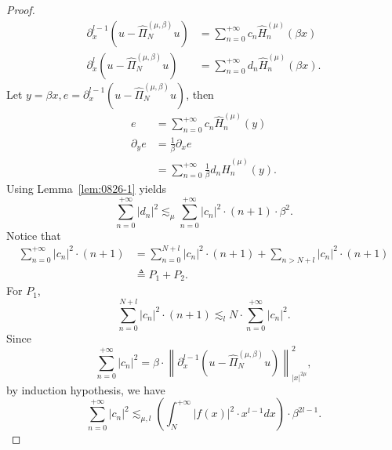 \documentclass[pdflatex,sn-aps]{sn-jnl}%
\theoremstyle{thmstyleone}%
\theoremstyle{thmstyletwo}%
\theoremstyle{thmstylethree}%
\begin{document}
\begin{appendices}
\begin{proof}
\begin{equation}
    \begin{aligned}
    \partial_x^{l-1}\left(u-\widehat{\Pi}_N^{(\mu, \beta)} u\right) & =\sum_{n=0}^{+\infty} c_n \widehat{H}_n^{(\mu)}(\beta x) \\
    \partial_x^l\left(u-\widehat{\Pi}_N^{(\mu, \beta)} u\right) & =\sum_{n=0}^{+\infty} d_n \widehat{H}_n^{(\mu)}(\beta x).
    \end{aligned}
  \end{equation}
  Let $y=\beta x, e=\partial_x^{l-1}\left(u-\widehat{\Pi}_N^{(\mu, \beta)} u\right)$, then
  \begin{equation}\label{eq:0826-21}
    \begin{aligned}
    e & =\sum_{n=0}^{+\infty} c_n \widehat{H}_n^{(\mu)}(y) \\
    \partial_y e & =\frac{1}{\beta} \partial_x e \\
    & =\sum_{n=0}^{+\infty} \frac{1}{\beta} d_n \widehat{H}_n^{(\mu)}(y).
    \end{aligned}
  \end{equation}
  Using Lemma~\ref{lem:0826-1} yields
  \begin{equation}\label{eq:0826-22}
    \sum_{n=0}^{+\infty}\left|d_n\right|^2 \lesssim_\mu \sum_{n=0}^{+\infty}\left|c_n\right|^2 \cdot(n+1) \cdot \beta^2.
  \end{equation}
  Notice that
  \begin{equation}\label{eq:0826-23}
    \begin{aligned}
      \sum_{n=0}^{+\infty}\left|c_n\right|^2 \cdot(n+1) &=\sum_{n=0}^{N+l}\left|c_n\right|^2 \cdot(n+1)+\sum_{n>N+l}\left|c_n\right|^2 \cdot(n+1) \\
      &\triangleq P_1 + P_2.
    \end{aligned}
  \end{equation}
  For $P_1$,
  \begin{equation}\label{eq:0826-24}
    \sum_{n=0}^{N+l}\left|c_n\right|^2 \cdot(n+1) \lesssim_l N \cdot \sum_{n=0}^{+\infty}\left|c_n\right|^2.
  \end{equation}
  Since
  \begin{equation}\label{eq:0826-25}
    \sum_{n=0}^{+\infty}\left|c_n\right|^2=\beta \cdot\left\|\partial_x^{l-1}\left(u-\widehat{\Pi}_N^{(\mu, \beta)} u\right)\right\|_{|x|^{2 \mu}}^2,
  \end{equation}
  by induction hypothesis, we have
  \begin{equation}\label{eq:0826-26}
    \sum_{n=0}^{+\infty}\left|c_n\right|^2 \lesssim_{\mu, l} \left(\int_N^{+\infty}|f(x)|^2 \cdot x^{l-1} d x\right) \cdot \beta^{2 l-1}.

\end{equation}
\end{proof}
\end{appendices}
\end{document}
